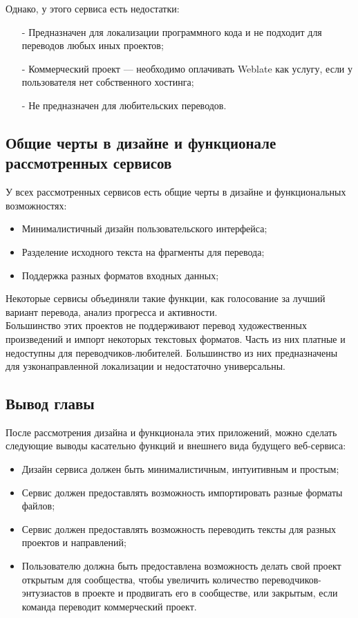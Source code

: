 \documentclass[a4paper,12pt]{article}
\begin{document}
Однако, у этого сервиса есть недостатки:
\begin{itemize}
	\item[-] Предназначен для локализации программного кода и не подходит для переводов любых иных проектов;
	\item[-] Коммерческий проект — необходимо оплачивать Weblate как услугу, если у пользователя нет собственного хостинга;
	\item[-] Не предназначен для любительских переводов.
\end{itemize}

\subsection{Общие черты в дизайне и функционале рассмотренных сервисов}
У всех рассмотренных сервисов есть общие черты в дизайне и функциональных возможностях:
\begin{itemize}
	\item Минималистичный дизайн пользовательского интерфейса;
	\item Разделение исходного текста на фрагменты для перевода;
	\item Поддержка разных форматов входных данных;
\end{itemize}
Некоторые сервисы объединяли такие функции, как голосование за лучший вариант перевода, анализ прогресса и активности.\\
Большинство этих проектов не поддерживают перевод художественных произведений и импорт некоторых текстовых форматов. Часть из них платные и недоступны для переводчиков-любителей. Большинство из них предназначены для узконаправленной локализации и недостаточно универсальны.\\

\subsection{Вывод главы}
После рассмотрения дизайна и функционала этих приложений, можно сделать следующие выводы касательно функций и внешнего вида будущего веб-сервиса:
\begin{itemize}
	\item Дизайн сервиса должен быть минималистичным, интуитивным и простым;
	\item Сервис должен предоставлять возможность импортировать разные форматы файлов;
	\item Сервис должен предоставлять возможность переводить тексты для разных проектов и направлений;
	\item Пользователю должна быть предоставлена возможность делать свой проект открытым для сообщества, чтобы увеличить количество переводчиков-энтузиастов в проекте и продвигать его в сообществе, или закрытым, если команда переводит коммерческий проект.
\end{itemize}
\end{document}
